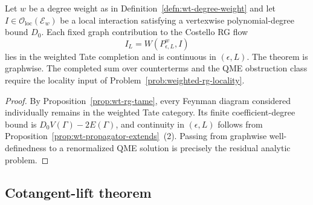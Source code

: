 \begin{thm}\label{thm:wt-rg-compatibility}
  Let $w$ be a degree weight as in
  Definition~\ref{defn:wt-degree-weight} and let
  $I\in\mathcal O_{\mathrm{loc}}(\mathcal E_w)$ be a local
  interaction satisfying a vertexwise polynomial-degree bound $D_0$.
  Each fixed graph contribution to the Costello RG flow
  $$I_L=W(P_{\epsilon,L}^{w},I)$$
  lies in the weighted Tate completion and is continuous in
  $(\epsilon,L)$.  The theorem is graphwise.  The completed sum over
  counterterms and the QME obstruction class require the locality
  input of Problem~\ref{prob:weighted-rg-locality}.
\end{thm}

\begin{proof}
  By Proposition~\ref{prop:wt-rg-tame}, every Feynman diagram
  considered individually remains in the weighted Tate category.  Its
  finite coefficient-degree bound is
  $D_0V(\Gamma)-2E(\Gamma)$, and continuity in $(\epsilon,L)$ follows
  from Proposition~\ref{prop:wt-propagator-extends}~(2).  Passing from
  graphwise well-definedness to a renormalized QME solution is
  precisely the residual analytic problem.
\end{proof}

\subsection*{Cotangent-lift theorem}

